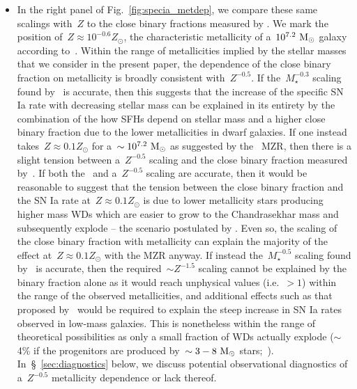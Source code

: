 \documentclass[ms.tex]{subfiles}
\begin{document}
\begin{itemize}
	\item In the right panel of Fig.~\ref{fig:specia_metdep}, we compare these
	same scalings with~$Z$ to the close binary fractions measured by
	\citet{Moe2019}.
	We mark the position of~$Z \approx 10^{-0.6} Z_\odot$, the characteristic
	metallicity of a~$10^{7.2}~\text{M}_\odot$ galaxy according to~\citet{Zahid2014}.
	Within the range of metallicities implied by the stellar masses that we
	consider in the present paper, the dependence of the close binary fraction
	on metallicity is broadly consistent with~$Z^{-0.5}$.
	If the~$M_\star^{-0.3}$ scaling found by~\citet{Gandhi2022} is accurate,
	then this suggests that the increase of the specific SN Ia rate with
	decreasing stellar mass can be explained in its entirety by the combination
	of the how SFHs depend on stellar mass and a higher close binary fraction
	due to the lower metallicities in dwarf galaxies.
	If one instead takes~$Z \approx 0.1 Z_\odot$ for a~$\sim10^{7.2}~\text{M}_\odot$
	as suggested by the~\citet{Andrews2013} MZR, then there is a slight
	tension between a~$Z^{-0.5}$ scaling and the close binary fraction measured
	by~\citet{Moe2019}.
	If both the~\citet{Andrews2013} and a~$Z^{-0.5}$ scaling are accurate, then
	it would be reasonable to suggest that the tension between the close binary
	fraction and the SN Ia rate at~$Z \approx 0.1 Z_\odot$ is due to lower
	metallicity stars producing higher mass WDs which are easier to grow to the
	Chandrasekhar mass and subsequently explode -- the scenario postulated by
	\citet{Kistler2013}.
	Even so, the scaling of the close binary fraction with metallicity can
	explain the majority of the effect at~$Z \approx 0.1 Z_\odot$ with the
	\citet{Andrews2013} MZR anyway.
	If instead the~$M_\star^{-0.5}$ scaling found by~\citet{Brown2019} is
	accurate, then the required~$\sim Z^{-1.5}$ scaling cannot be explained by
	the binary fraction alone as it would reach unphysical values (i.e.~$>1$)
	within the range of the observed metallicities, and additional effects
	such as that proposed by~\citet{Kistler2013} would be required to explain
	the steep increase in SN Ia rates observed in low-mass galaxies.
	This is nonetheless within the range of theoretical possibilities as only a
	small fraction of WDs actually explode ($\sim$4\% if the progenitors are
	produced by~$\sim3 - 8~\text{M}_\odot$ stars;~\citealp*{Maoz2012b}).
	In~\S~\ref{sec:diagnostics} below, we discuss potential observational
	diagnostics of a~$Z^{-0.5}$ metallicity dependence or lack thereof.


\end{itemize}
\end{document}
